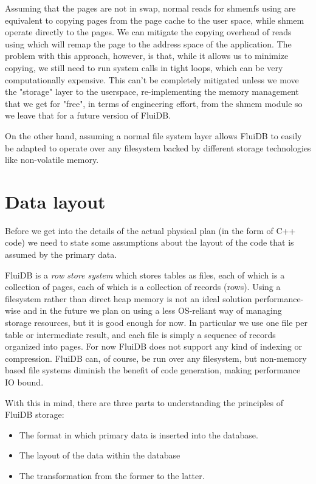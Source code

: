 Assuming that the pages are not in swap, normal reads for shmemfs
using  are equivalent to copying pages from the page cache to
the user space, while shmem operate directly to
the pages. We can mitigate the copying overhead of reads using 
which will remap the page to the address space of the application. 
The problem with this approach, however, is that, while it allows us to minimize
copying, we still need to run system calls in tight loops, which can
be very computationally expensive. This can't be completely mitigated
unless we move the "storage" layer to the userspace, re-implementing
the memory management that we get for "free", in terms of engineering
effort, from the shmem module so we leave that for a future version of
FluiDB.

On the other hand, assuming a normal file system layer allows  FluiDB to easily be adapted to
operate over any filesystem backed by different storage technologies
like non-volatile memory.

\section{Data layout}

Before we get into the details of the actual physical plan (in the
form of C++ code) we need to state some assumptions about the layout
of the code that is assumed by the primary data.

FluiDB is a \emph{row store system} which stores tables as files, 
each of which is a collection of pages, each of which is a collection of records (rows).
Using a filesystem rather than direct heap memory is not an ideal solution
performance-wise and in the future we plan on using a less OS-reliant
way of managing storage resources, but it is good enough for now. In
particular we use one file per table or intermediate result, and each
file is simply a sequence of records organized into pages. For now
FluiDB does not support any kind of indexing or compression. FluiDB
can, of course, be run over any filesystem, but non-memory based file
systems diminish the benefit of code generation, making performance IO
bound.

With this in mind, there are three parts to understanding the
principles of FluiDB storage:

\begin{itemize}
\item The format in which primary data is inserted into the database.
\item The layout of the data within the database
\item The transformation from the former to the latter.
\end{itemize}

